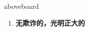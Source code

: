 
\begin{frame}
{\huge aboveboard}
\begin{center}
\begin{enumerate}\Large
  \item \textbf{无欺诈的，光明正大的}
\end{enumerate}
\end{center}
\end{frame}
